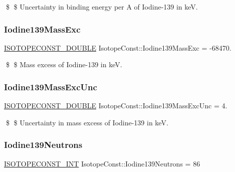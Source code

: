 \$ \$ Uncertainty in binding energy per A of Iodine-\/139 in keV. \mbox{\label{group___isotope_const-_iodine-_i139_gac013ee1a173a369dfde4f2d3e5642388}} 
\subsubsection{\texorpdfstring{Iodine139\+Mass\+Exc}{Iodine139MassExc}}
{\footnotesize\ttfamily \mbox{\hyperlink{group___isotope_const-_macros_ga8f45a7272ce02c0b4c65c44636ed719a}{I\+S\+O\+T\+O\+P\+E\+C\+O\+N\+S\+T\+\_\+\+D\+O\+U\+B\+LE}} Isotope\+Const\+::\+Iodine139\+Mass\+Exc = -\/68470.}

\$ \$ Mass excess of Iodine-\/139 in keV. \mbox{\label{group___isotope_const-_iodine-_i139_ga162ddfd76f4049818a2c571a3b58d6fa}} 
\subsubsection{\texorpdfstring{Iodine139\+Mass\+Exc\+Unc}{Iodine139MassExcUnc}}
{\footnotesize\ttfamily \mbox{\hyperlink{group___isotope_const-_macros_ga8f45a7272ce02c0b4c65c44636ed719a}{I\+S\+O\+T\+O\+P\+E\+C\+O\+N\+S\+T\+\_\+\+D\+O\+U\+B\+LE}} Isotope\+Const\+::\+Iodine139\+Mass\+Exc\+Unc = 4.}

\$ \$ Uncertainty in mass excess of Iodine-\/139 in keV. \mbox{\label{group___isotope_const-_iodine-_i139_gab1410a2d73c14a9aeecf7dd8acf49a54}} 
\subsubsection{\texorpdfstring{Iodine139\+Neutrons}{Iodine139Neutrons}}
{\footnotesize\ttfamily \mbox{\hyperlink{group___isotope_const-_macros_ga5f18360b3e99483a35c32d789e62621c}{I\+S\+O\+T\+O\+P\+E\+C\+O\+N\+S\+T\+\_\+\+I\+NT}} Isotope\+Const\+::\+Iodine139\+Neutrons = 86}

